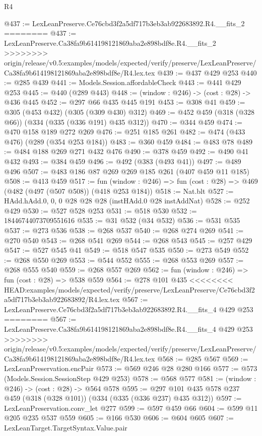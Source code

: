 \begin{lexlean}{R4}
\begin{coremodule}
{{{{{{{{{{{{{{@437 := LexLeanPreserve.Ce76cbd3f2a5df717b3eb3ab922683892.R4.__fits_2
========
@437 := LexLeanPreserve.Ca38fa9b614198121869aba2e898bdf8e.R4.__fits_2
>>>>>>>> origin/release/v0.5:examples/models/expected/verify/preserve/LexLeanPreserve/Ca38fa9b614198121869aba2e898bdf8e/R4.lex.tex
@439 := @437 @429 @253
@440 := @285 @439
@441 := Models.Session.affordableCheck
@443 := @441 @429 @253
@445 := @440 (@289 @443)
@448 := (window : @246) -> (cost : @28) -> @436 @445
@452 := @297 @66 @435 @445 @191
@453 := @308 @41
@459 := @305 (@453 @432) (@305 (@309 @430) @312)
@469 := @452 @459 (@318 (@328 @66)) (@334 (@335 (@336 @191) @435 @312))
@470 := @344 @459
@474 := @470 @158 @189 @272 @269
@476 := @251 @185 @261
@482 := @474 (@433 @476) (@289 (@354 @253 @184))
@483 := @360 @459
@484 := @483 @78
@489 := @484 @188 @269 @271 @432 @476
@490 := @378 @459
@492 := @490 @41 @432
@493 := @384 @459
@496 := @492 (@383 (@493 @41))
@497 := @489 @496
@507 := @483 @186 @87 @269 @269 @185 @261 (@407 @459 @11 @185)
@508 := @413 @459
@517 := fun (window : @246) => fun (cost : @28) => @469 (@482 (@497 (@507 @508)) (@418 @253 @184))
@518 := Nat.blt
@527 := HAdd.hAdd.{0, 0, 0} @28 @28 @28 (instHAdd.{0} @28 instAddNat)
@528 := @252 @429
@530 := @527 @528 @253
@531 := @518 @530
@532 := 18446744073709551616
@535 := @31 @532 (@34 @532)
@536 := @531 @535
@537 := @273 @536
@538 := @268 @537
@540 := @268 @274 @269
@541 := @270 @540
@543 := @268 @541 @269
@544 := @268 @543
@545 := @257 @429
@547 := @527 @545 @41
@549 := @518 @547 @535
@550 := @273 @549
@552 := @268 @550 @269
@553 := @544 @552
@555 := @268 @553 @269
@557 := @268 @555 @540
@559 := @268 @557 @269
@562 := fun (window : @246) => fun (cost : @28) => @538 @559
@564 := @278 @101 @435
<<<<<<<< HEAD:examples/models/expected/verify/preserve/LexLeanPreserve/Ce76cbd3f2a5df717b3eb3ab922683892/R4.lex.tex
@567 := LexLeanPreserve.Ce76cbd3f2a5df717b3eb3ab922683892.R4.__fits_4 @429 @253
========
@567 := LexLeanPreserve.Ca38fa9b614198121869aba2e898bdf8e.R4.__fits_4 @429 @253
>>>>>>>> origin/release/v0.5:examples/models/expected/verify/preserve/LexLeanPreserve/Ca38fa9b614198121869aba2e898bdf8e/R4.lex.tex
@568 := @285 @567
@569 := LexLeanPreservation.encPair
@573 := @569 @246 @28 @280 @166
@577 := @573 (Models.Session.SessionStep @429 @253)
@578 := @568 @577
@581 := (window : @246) -> (cost : @28) -> @564 @578
@595 := @297 @101 @435 @578 @237 @459 (@318 (@328 @101)) (@334 (@335 (@336 @237) @435 @312))
@597 := LexLeanPreservation.conv_let @277
@599 := @597 @459 @66
@604 := @599 @11 @205 @235 @537 @559
@605 := @166 @530
@606 := @604 @605
@607 := LexLeanTarget.TargetSyntax.Value.pair
}}}}}}}}}}}}}}
\end{coremodule}
\end{lexlean}
